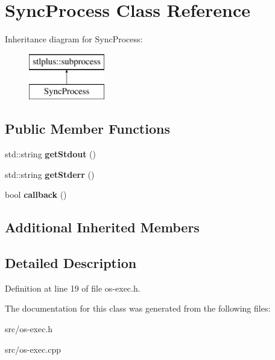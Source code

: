 \hypertarget{class_sync_process}{}\section{Sync\+Process Class Reference}
\label{class_sync_process}
Inheritance diagram for Sync\+Process\+:\begin{figure}[H]
\begin{center}
\leavevmode
\includegraphics[height=2.000000cm]{class_sync_process}
\end{center}
\end{figure}
\subsection*{Public Member Functions}
\begin{DoxyCompactItemize}
\item 
std\+::string {\bfseries get\+Stdout} ()\hypertarget{class_sync_process_afcf9052d5ae22d47b5cefd2efe798c82}{}\label{class_sync_process_afcf9052d5ae22d47b5cefd2efe798c82}

\item 
std\+::string {\bfseries get\+Stderr} ()\hypertarget{class_sync_process_a6b600840b6ba3c7ac4957de07819dabc}{}\label{class_sync_process_a6b600840b6ba3c7ac4957de07819dabc}

\item 
bool {\bfseries callback} ()\hypertarget{class_sync_process_ae81f7ee1b493abcab104e961d97578a2}{}\label{class_sync_process_ae81f7ee1b493abcab104e961d97578a2}

\end{DoxyCompactItemize}
\subsection*{Additional Inherited Members}


\subsection{Detailed Description}


Definition at line 19 of file os-\/exec.\+h.



The documentation for this class was generated from the following files\+:\begin{DoxyCompactItemize}
\item 
src/os-\/exec.\+h\item 
src/os-\/exec.\+cpp\end{DoxyCompactItemize}
